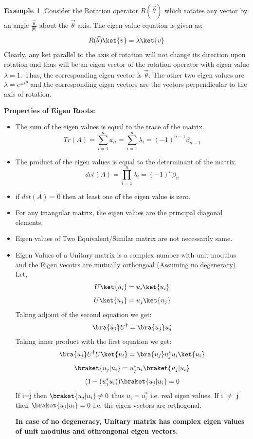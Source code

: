 \documentclass[12pt, oneside]{book}
\theoremstyle{definition}
\theoremstyle{definition}
\newtheorem{example}{Example}[section]
\theoremstyle{remark}
\begin{document}
\begin{example}
    Consider the Rotation operator $R(\vec{\theta})$ which rotates any vector by an angle $\frac{\vec{\theta}}{|\theta|}$ about the $\vec{\theta}$ axis.
    The eigen value equation is given as:
    \[R(\vec{\theta})\ket{v}=\lambda\ket{v}\]
    Clearly, any ket parallel to the axis of rotation will not change its direction upon rotation and thus will be an eigen vector of the rotation operator with eigen value $\lambda=1$. Thus, 
    the corresponding eigen vector is $\vec{\theta}$. 
    The other two eigen values are $\lambda=e^{\pm i\theta}$ and the corresponding eigen vectors are the vectors perpendicular to the axis of rotation.
\end{example}

\textbf{Properties of Eigen Roots: }
\begin{itemize}
    \item The sum of the eigen values is equal to the trace of the matrix.
    \[ Tr(A)=\sum_{i=1}^n a_{ii}=\sum_{i=1}^n \lambda_i = (-1)^{n-1}\beta_{n-1} \]
    \item The product of the eigen values is equal to the determinant of the matrix.
    \[ det(A)=\prod_{i=1}^n \lambda_i = (-1)^n\beta_{n} \]
    \item if $det(A)=0$ then at least one of the eigen value is zero.
    \item For any triangular matrix, the eigen values are the principal diagonal elements.
    \item Eigen values of Two Equivalent/Similar matrix are not necessarily same.
    \item Eigen Values of a Unitary matrix is a complex number with unit modulus and the Eigen vecotrs are mutually orthongoal
    (Assuming no degeneracy).
    Let, 
    \[U\ket{u_i} = u_i\ket{u_i}\]
    \[U\ket{u_j} = u_j\ket{u_j}\]
    Taking adjoint of the second equation we get:
    \[ \bra{u_j}U^{\dagger}=\bra{u_j}u_j^* \]
    Taking inner product with the first equation we get:
    \[ \bra{u_j}U^{\dagger}U\ket{u_i}=\bra{u_j}u_j^*u_i\ket{u_i} \]
    \[ \braket{u_j|u_i}=u_j^*u_i \braket{u_j|u_i} \]
    \[ (1-(u_j^*u_i))\braket{u_j|u_i} = 0\]
    If i=j then $\braket{u_j|u_i} \neq 0$ thus $u_i=u_i^*$ i.e. real eigen values. If i $\neq$ j then $\braket{u_j|u_i}=0$ i.e. the eigen vectors are orthogonal.
    
    \textbf{In case of no degeneracy, Unitary matrix has complex eigen values of unit modulus and othrongonal eigen vectors.}
    

\end{itemize}
\end{document}
